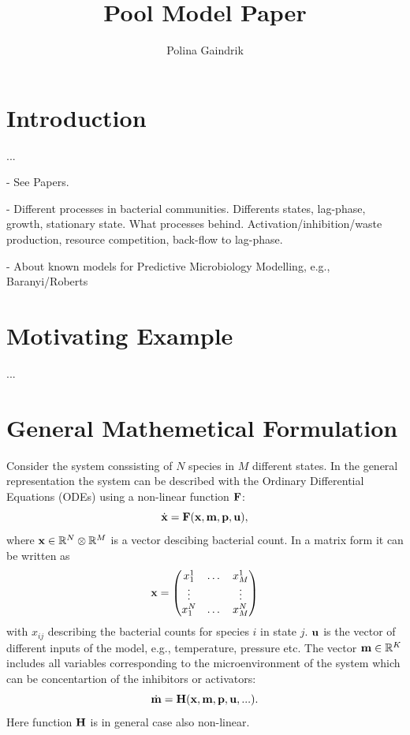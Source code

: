 \documentclass[10pt,A4paper]{article}
\title{Pool Model Paper}
\author{Polina Gaindrik}
\begin{document}
\maketitle

\tableofcontents

\newpage

\section{Introduction}

...

- See Papers.

- Different processes in bacterial communities. 
Differents states, lag-phase, growth, stationary state. What processes behind.
Activation/inhibition/waste production, resource competition, back-flow to lag-phase.

- About known models for Predictive Microbiology Modelling, e.g., Baranyi/Roberts

\section{Motivating Example}

...


\section{General Mathemetical Formulation}
Consider the system conssisting of $N$ species in $M$ different states.
In the general representation the system can be described with the Ordinary Differential Equations (ODEs) using a non-linear function $\mathbf{F}$:
\begin{equation}
   \dot{\mathbf{x}} = \mathbf{F}(\mathbf{x}, \mathbf{m}, \mathbf{p}, \mathbf{u}),
   \label{eq:model_ODE}
\end{equation}
where  $\mathbf{x} \in \mathbb{R}^{N}  \otimes \mathbb{R}^{M}$ is a vector descibing bacterial count.
In a matrix form it can be written as
\begin{equation}
    \mathbf{x} = \begin{pmatrix}
        x^1_1  & \dots & x^1_M  \\
        \vdots &       & \vdots \\
        x^N_1  & \dots & x^N_M  \\
            \end{pmatrix}
    \label{eq:model_bact}
\end{equation}
with $x_{ij}$ describing the bacterial counts for species $i$ in state $j$.
$\mathbf{u}$ is the vector of different inputs of the model, e.g., temperature, pressure etc.
The vector $\mathbf{m} \in \mathbb{R}^{K}$ includes all variables corresponding to the microenvironment of the system which can be concentartion of the inhibitors or activators:
\begin{equation}
    \dot{\mathbf{m}} = \mathbf{H} (\mathbf{x}, \mathbf{m}, \mathbf{p}, \mathbf{u}, ...).
    \label{eq:model_microenv}
\end{equation}
Here function $\mathbf{H}$ is in general case also non-linear.
\end{document}
